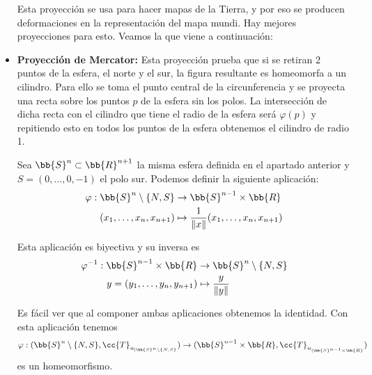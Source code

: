 \begin{ejemplo}
\begin{itemize}
        Esta proyección se usa para hacer mapas de la Tierra, y por eso se producen deformaciones en la representación del mapa mundi. Hay mejores proyecciones para esto. Veamos la que viene a continuación:

        \item \textbf{Proyección de Mercator:} Esta proyección prueba que si se retiran 2 puntos de la esfera, el norte y el sur, la figura resultante es homeomorfa a un cilindro. Para ello se toma el punto central de la circunferencia y se proyecta una recta sobre los puntos $p$ de la esfera sin los polos. La intersección de dicha recta con el cilindro que tiene el radio de la esfera será $\varphi(p)$ y repitiendo esto en todos los puntos de la esfera obtenemos el cilindro de radio 1.
        
        
        
        Sea $\bb{S}^n \subset \bb{R}^{n+1}$ la misma esfera definida en el apartado anterior y $S=(0,\dots, 0,-1)$ el polo sur. Podemos definir la siguiente aplicación:
        \begin{align*}
            \varphi : \bb{S}^n\setminus \{N, S\} &\to \bb{S}^{n-1}\times \bb{R}\\
            (x_1, \dots, x_n, x_{n+1}) &\mapsto \frac{1}{\|x\|} (x_1, \dots, x_n, x_{n+1})
        \end{align*}

        Esta aplicación es biyectiva y su inversa es
        \begin{align*}
            \varphi^{-1} : \bb{S}^{n-1}\times \bb{R} &\to \bb{S}^n \setminus \{N,S\}\\
            y=(y_1, \dots, y_n, y_{n+1}) &\mapsto \frac{y}{\|y\|}
        \end{align*}

        Es fácil ver que al componer ambas aplicaciones obtenemos la identidad. Con esta aplicación tenemos
        \begin{gather*}
            \varphi : (\bb{S}^n\setminus \{N,S\}, \cc{T}_{u_{|\bb{S}^n\setminus \{N,S\}}}) \to (\bb{S}^{n-1}\times \bb{R}, \cc{T}_{u_{|\bb{S}^{n-1}\times \bb{R}}})
        \end{gather*}
        es un homeomorfismo.
    \end{itemize}
    \endsquare
\end{ejemplo}

